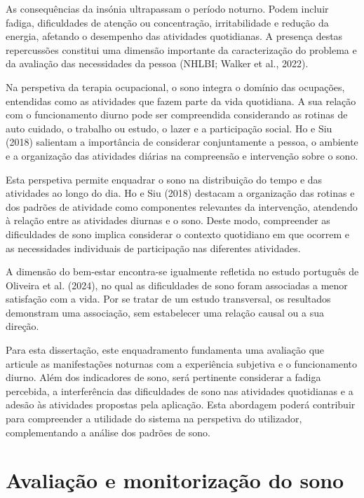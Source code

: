 As consequências da insónia ultrapassam o período noturno. Podem incluir fadiga, dificuldades de atenção ou concentração, irritabilidade e redução da energia, afetando o desempenho das atividades quotidianas. A presença destas repercussões constitui uma dimensão importante da caracterização do problema e da avaliação das necessidades da pessoa (NHLBI; Walker et al., 2022).

Na perspetiva da terapia ocupacional, o sono integra o domínio das ocupações, entendidas como as atividades que fazem parte da vida quotidiana. A sua relação com o funcionamento diurno pode ser compreendida considerando as rotinas de auto cuidado, o trabalho ou estudo, o lazer e a participação social. Ho e Siu (2018) salientam a importância de considerar conjuntamente a pessoa, o ambiente e a organização das atividades diárias na compreensão e intervenção sobre o sono.

Esta perspetiva permite enquadrar o sono na distribuição do tempo e das atividades ao longo do dia. Ho e Siu (2018) destacam a organização das rotinas e dos padrões de atividade como componentes relevantes da intervenção, atendendo à relação entre as atividades diurnas e o sono. Deste modo, compreender as dificuldades de sono implica considerar o contexto quotidiano em que ocorrem e as necessidades individuais de participação nas diferentes atividades.

A dimensão do bem-estar encontra-se igualmente refletida no estudo português de Oliveira et al. (2024), no qual as dificuldades de sono foram associadas a menor satisfação com a vida. Por se tratar de um estudo transversal, os resultados demonstram uma associação, sem estabelecer uma relação causal ou a sua direção.

Para esta dissertação, este enquadramento fundamenta uma avaliação que articule as manifestações noturnas com a experiência subjetiva e o funcionamento diurno. Além dos indicadores de sono, será pertinente considerar a fadiga percebida, a interferência das dificuldades de sono nas atividades quotidianas e a adesão às atividades propostas pela aplicação. Esta abordagem poderá contribuir para compreender a utilidade do sistema na perspetiva do utilizador, complementando a análise dos padrões de sono.



\section{Avaliação e monitorização do sono} 
\label{sec:chap2_sleepMonitoring} %

